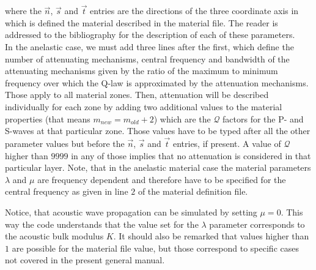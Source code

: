 \documentclass[12pt,twoside]{article}
\def\Q{{\mathcal Q}}
\begin{document}
\noindent
where the $\vec n$, $\vec s$ and $\vec t$ entries are the directions of the three coordinate axis 
in which is defined the material described in the material file.
The reader is addressed to the bibliography for the description of each of these parameters.\\

\noindent
In the anelastic case, we must add three lines after the first, 
which define the number of attenuating mechanisms, central frequency and bandwidth of the attenuating mechanisms 
given by the ratio of the maximum to minimum frequency over which the Q-law is approximated by the attenuation mechanisms. 
Those apply to all material zones. 
Then, attenuation will be described individually for each zone by adding two additional values to the material properties 
(that means $m_{new}=m_{old}+2$) which are the $\Q$ factors for the P- and S-waves at that particular zone.
Those values have to be typed after all the other parameter values but before the $\vec n$, $\vec s$ and $\vec t$ entries, if present.
A value of $\Q$ higher than $9999$ in any of those implies that no attenuation is considered in that particular layer.
Note, that in the anelastic material case the material parameters $\lambda$ and $\mu$
are frequency dependent and therefore have to be specified for the central frequency as given in line $2$ of the
material definition file.

\noindent
Notice, that acoustic wave propagation can be simulated by setting $\mu=0$.
This way the code understands that the value set for the $\lambda$ parameter corresponds to the acoustic bulk modulus $K$.
It should also be remarked that values higher than $1$ are possible for the material file value, 
but those correspond to specific cases not covered in the present general manual.
\end{document}
